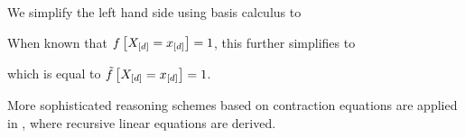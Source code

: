 \begin{example}
{        




    }

    We simplify the left hand side using basis calculus to

    When known that $f\left[X_{[d]}=x_{[d]}\right]=1$, this further simplifies to

    which is equal to $\tilde{f}\left[X_{[d]}=x_{[d]}\right]=1$.
\end{example}

More sophisticated reasoning schemes based on contraction equations are applied in \cite{sato_linear_2017,tsilionis_tensor-based_2024}, where recursive linear equations are derived.